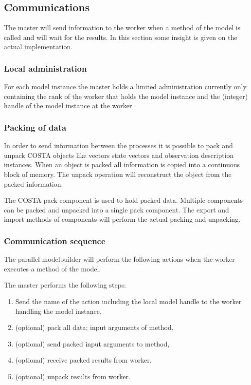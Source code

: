 \documentclass[a4paper,12pt]{article}
\begin{document}
\subsection{Communications}
The master will send information to the worker when a method of the model
is called and will wait for the results. In this section some insight is
given on the actual implementation.

\subsubsection{Local administration}
For each model instance the master holds a limited administration currently
only containing the rank of the worker that holds the model instance and
the (integer) handle of the model instance at the worker.

\subsubsection{Packing of data}
In order to send information between the processes it is possible to pack
and unpack COSTA objects like vectors state vectors and observation
description instances. 
When an object is packed all information is copied into a continuous block
of memory. The unpack operation will reconstruct the object from the packed
information.

The COSTA pack component is used to hold packed data. Multiple components
can be packed and unpacked into a single pack component. The export and
import methods of components will perform the actual packing and unpacking. 

\subsubsection{Communication sequence}
The parallel modelbuilder will perform the following actions when the worker
executes a method of the model.

The master performs the following steps:
\begin{enumerate}
\item Send the name of the action including the local model handle to the
      worker handling the model instance,
\item (optional) pack all data; input arguments of method,
\item (optional) send packed input arguments to method,
\item (optional) receive packed results from worker.
\item (optional) unpack results from worker.
\end{enumerate}
\end{document}
